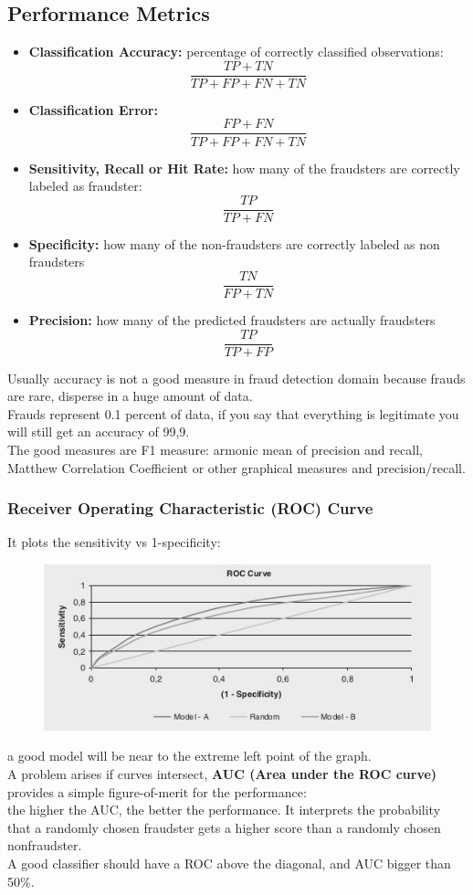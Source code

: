     \subsection{Performance Metrics}
        \begin{itemize}
            \item \textbf{Classification Accuracy:} percentage of correctly classified observations: $$\frac{TP+TN}{TP+FP+FN+TN}$$
            \item \textbf{Classification Error:} $$\frac{FP+FN}{TP+FP+FN+TN}$$
            \item \textbf{Sensitivity, Recall or Hit Rate:} how many of the fraudsters are correctly labeled as fraudster: $$\frac{TP}{TP+FN}$$
            \item \textbf{Specificity:} how many of the non-fraudsters are correctly labeled as non fraudsters $$\frac{TN}{FP+TN}$$
            \item \textbf{Precision:} how many of the predicted fraudsters are actually fraudsters $$\frac{TP}{TP+FP}$$
        \end{itemize}
        Usually accuracy is not a good measure in fraud detection domain because frauds are rare, disperse in a huge amount of data.\\
        Frauds represent 0.1 percent of data, if you say that everything is legitimate you will still get an accuracy of 99,9.\\
        The good measures are F1 measure: armonic mean of precision and recall, Matthew Correlation Coefficient or other graphical measures and precision/recall.
        \subsubsection{Receiver Operating Characteristic (ROC) Curve}
            It plots the sensitivity vs 1-specificity:
            \begin{figure}[ht!]
                \centering
                \includegraphics[width=0.6\linewidth]{lecture_16/roc.png}
            \end{figure}
            a good model will be near to the extreme left point of the graph.\\
            A problem arises if curves intersect, \textbf{AUC (Area under the ROC curve)} provides a simple figure-of-merit for the performance:\\
            the higher the AUC, the better the performance. It interprets the probability that a randomly chosen fraudster gets a higher score than a randomly chosen nonfraudster.\\
            A good classifier should have a ROC above the diagonal, and AUC bigger than 50\%.

